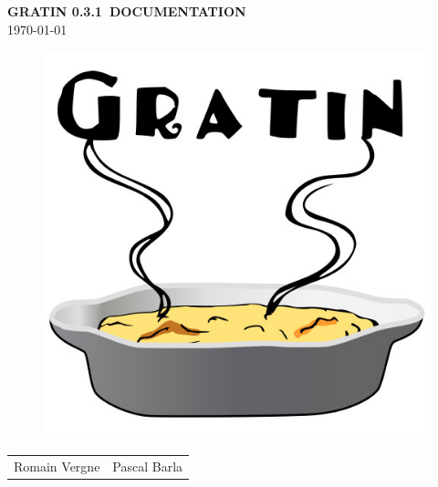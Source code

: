 \documentclass[12pt,a4paper,usenames,dvipsnames]{article}
\newcommand{\gratinversion}{0.3.1}
\newcommand{\gratintitle}{Gratin \gratinversion \  Documentation}
\newcommand{\addtitle}{
  \begin{center}
    \LARGE{\textbf{\expandafter\MakeUppercase\expandafter{\gratintitle}}}\\ \small{\today}
  \end{center}
}
\newcommand{\addauthors}{
  \begin{center}
    \begin{tabular}{cc}
      \large{Romain Vergne} & \large{Pascal Barla}
    \end{tabular}
  \end{center}
}
\begin{document}
\begin{titlepage}
  \vspace*{\fill}
  \addtitle
  \begin{figure}[h!]
    \centering
    \includegraphics[width=0.5\linewidth]{imgs/gratin.jpg}
  \end{figure}
  \addauthors
  \vspace*{\fill}
\end{titlepage}

\newpage
\tableofcontents
\newpage


\newpage

\newpage

\newpage

\newpage


\end{document}
